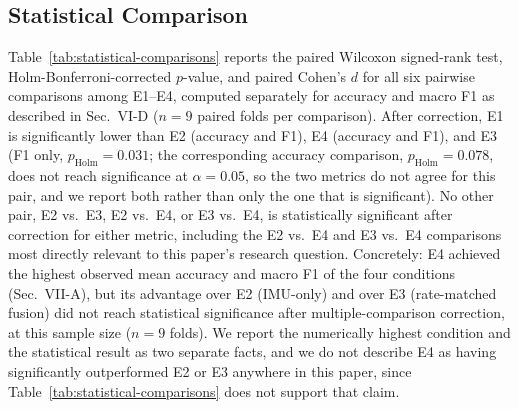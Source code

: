 \documentclass[conference]{IEEEtran}
\begin{document}
\subsection{Statistical Comparison}
\label{subsec:results-statistical}

Table~\ref{tab:statistical-comparisons} reports the paired Wilcoxon
signed-rank test, Holm-Bonferroni-corrected $p$-value, and paired
Cohen's $d$ for all six pairwise comparisons among E1--E4, computed
separately for accuracy and macro F1 as described in Sec.~VI-D
($n=9$ paired folds per comparison). After correction, E1 is
significantly lower than E2 (accuracy and F1), E4 (accuracy and F1),
and E3 (F1 only, $p_{\text{Holm}}=0.031$; the corresponding accuracy
comparison, $p_{\text{Holm}}=0.078$, does not reach significance at
$\alpha=0.05$, so the two metrics do not agree for this pair, and we
report both rather than only the one that is significant). No other
pair, E2 vs.\ E3, E2 vs.\ E4, or E3 vs.\ E4, is statistically
significant after correction for either metric, including the E2
vs.\ E4 and E3 vs.\ E4 comparisons most directly relevant to this
paper's research question. Concretely: E4 achieved the highest
observed mean accuracy and macro F1 of the four conditions
(Sec.~VII-A), but its advantage over E2 (IMU-only) and over E3
(rate-matched fusion) did not reach statistical significance after
multiple-comparison correction, at this sample size ($n=9$ folds).
We report the numerically highest condition and the statistical
result as two separate facts, and we do not describe E4 as having
significantly outperformed E2 or E3 anywhere in this paper, since
Table~\ref{tab:statistical-comparisons} does not support that claim.
\end{document}
